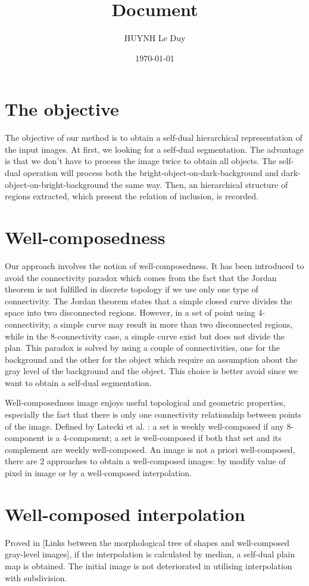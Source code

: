 \documentclass[12pt,a4paper,draft]{article}
\title{Document}
\author{HUYNH Le Duy}
\date{\today}
\begin{document}
\maketitle
\section{The objective}
The objective of our method is to obtain a self-dual hierarchical representation of the input images. At first, we looking for a self-dual segmentation. The advantage is that we don't have to process the image twice to obtain all objects. The self-dual operation will process both the bright-object-on-dark-background and dark-object-on-bright-background the same way. Then, an hierarchical structure of regions extracted, which present the relation of inclusion, is recorded.

\section{Well-composedness}


Our approach involves the notion of well-composedness. It has been introduced to avoid the connectivity paradox which comes from the fact that the Jordan theorem is not fulfilled in discrete topology if we use only one type of connectivity. The Jordan theorem states that a simple closed curve divides the space into two disconnected regions. However, in a set of point using 4-connectivity, a simple curve may result in more than two disconnected regions, while in the 8-connectivity case, a simple curve exist but does not divide the plan. This paradox is solved by using a couple of connectivities, one for the background and the other for the object which require an assumption about the gray level of the background and the object. This choice is better avoid since we want to obtain a self-dual segmentation. 


Well-composedness image enjoys useful topological and geometric properties, especially the fact that there is only one connectivity relationship between points of the image. Defined by Latecki et al. : a set is weekly well-composed if any 8-component is a 4-component; a set is well-composed if both that set and its complement are weekly well-composed. An image is not a priori well-composed, there are 2 approaches to obtain a well-composed images: by modify value of pixel in image or by a well-composed interpolation.

\section{Well-composed interpolation}
Proved in [Links between the morphological tree of shapes and well-composed gray-level images], if the interpolation is calculated by median, a self-dual plain map is obtained. The initial image is not deteriorated in utilising interpolation with subdivision. 
\end{document}
